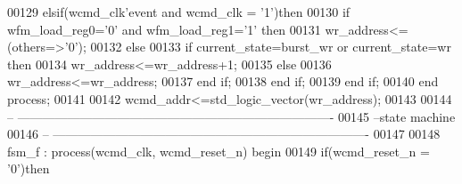 \begin{DoxyCode}
00129     \textcolor{keywordflow}{elsif}\textcolor{vhdlchar}{(}\textcolor{vhdlchar}{wcmd_clk}\textcolor{vhdlchar}{'}\textcolor{vhdlkeyword}{event} \textcolor{keywordflow}{and} \textcolor{vhdlchar}{wcmd_clk} \textcolor{vhdlchar}{=} \textcolor{vhdlchar}{'}\textcolor{vhdllogic}{}\textcolor{vhdllogic}{1}\textcolor{vhdlchar}{'}\textcolor{vhdlchar}{)}\textcolor{keywordflow}{then} 
00130         \textcolor{keywordflow}{if} \textcolor{vhdlchar}{wfm_load_reg0}\textcolor{vhdlchar}{=}\textcolor{vhdlchar}{'}\textcolor{vhdllogic}{}\textcolor{vhdllogic}{0}\textcolor{vhdlchar}{'} \textcolor{keywordflow}{and} \textcolor{vhdlchar}{wfm_load_reg1}\textcolor{vhdlchar}{=}\textcolor{vhdlchar}{'}\textcolor{vhdllogic}{}\textcolor{vhdllogic}{1}\textcolor{vhdlchar}{'} \textcolor{keywordflow}{then}
00131             \textcolor{vhdlchar}{wr_address}\textcolor{vhdlchar}{<=}\textcolor{vhdlchar}{(}\textcolor{keywordflow}{others}\textcolor{vhdlchar}{=}\textcolor{vhdlchar}{>}\textcolor{vhdlchar}{'}\textcolor{vhdllogic}{}\textcolor{vhdllogic}{0}\textcolor{vhdlchar}{'}\textcolor{vhdlchar}{)};
00132         \textcolor{keywordflow}{else}
00133             \textcolor{keywordflow}{if} \textcolor{vhdlchar}{current_state}\textcolor{vhdlchar}{=}\textcolor{vhdlchar}{burst\_wr} \textcolor{keywordflow}{or} \textcolor{vhdlchar}{current_state}\textcolor{vhdlchar}{=}\textcolor{vhdlchar}{wr} \textcolor{keywordflow}{then}
00134                 \textcolor{vhdlchar}{wr_address}\textcolor{vhdlchar}{<=}\textcolor{vhdlchar}{wr_address}\textcolor{vhdlchar}{+}\textcolor{vhdllogic}{}\textcolor{vhdllogic}{1};
00135             \textcolor{keywordflow}{else} 
00136                 \textcolor{vhdlchar}{wr_address}\textcolor{vhdlchar}{<=}\textcolor{vhdlchar}{wr_address};
00137             \textcolor{keywordflow}{end} \textcolor{keywordflow}{if}; 
00138         \textcolor{keywordflow}{end} \textcolor{keywordflow}{if};
00139     \textcolor{keywordflow}{end} \textcolor{keywordflow}{if}; 
00140 \textcolor{keywordflow}{end} \textcolor{keywordflow}{process};
00141 
00142 \textcolor{vhdlchar}{wcmd_addr}\textcolor{vhdlchar}{<=}\textcolor{comment}{std\_logic\_vector}\textcolor{vhdlchar}{(}\textcolor{vhdlchar}{wr_address}\textcolor{vhdlchar}{)};
00143 
00144 \textcolor{keyword}{-- ----------------------------------------------------------------------------}
00145 \textcolor{keyword}{--state machine}
00146 \textcolor{keyword}{-- ----------------------------------------------------------------------------}
00147 
00148 fsm\_f : \textcolor{keywordflow}{process}(wcmd_clk, wcmd_reset_n) \textcolor{keywordflow}{begin}
00149     \textcolor{keywordflow}{if}\textcolor{vhdlchar}{(}\textcolor{vhdlchar}{wcmd_reset_n} \textcolor{vhdlchar}{=} \textcolor{vhdlchar}{'}\textcolor{vhdllogic}{}\textcolor{vhdllogic}{0}\textcolor{vhdlchar}{'}\textcolor{vhdlchar}{)}\textcolor{keywordflow}{then}

\end{DoxyCode}
